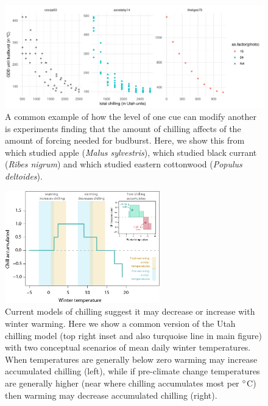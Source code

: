 \documentclass[11pt,letter]{article}
\begin{document}
\clearpage
\begin{figure}
\centering
\includegraphics[width=1\textwidth]{..//..//analyses/limitingcues/figures/gddbyutah.pdf}
\caption{A common example of how the level of one cue can modify another is experiments finding that the amount of chilling affects of the amount of forcing  needed for budburst. Here, we show this from \citet{Cronje:2003aa} which studied apple (\emph{Malus sylvestris}), \citet{Sonsteby:2014aa} which studied black currant (\emph{Ribes nigrum}) and \citet{Thielges:1976aa} which studied eastern cottonwood (\emph{Populus deltoides}).}
  \label{fig:gddbyutah} 
\end{figure}

\clearpage
\begin{figure}[t!]
\centering
\includegraphics[width=0.6\textwidth]{figures/utahchill_limiting.png}
\caption{Current models of chilling suggest it may decrease or increase with winter warming. Here we show a common version of the Utah chilling model (top right inset and also turquoise line in main figure) with two conceptual scenarios of mean daily winter temperatures. When temperatures are generally below zero warming may increase accumulated chilling (left), while if pre-climate change temperatures are generally higher (near where chilling accumulates most per $\degree$C) then warming may decrease accumulated chilling (right).}
  \label{fig:chilling}
\end{figure}
\end{document}
